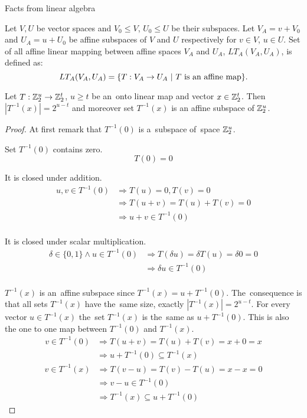 \begin{chapter}{Facts from linear algebra}
\begin{definition}
Let $V, U$ be vector spaces and $V_0 \leq V$, $U_0 \leq U$ be their subspaces. Let $V_A = v + V_0$ and $U_A = u + U_0$ be affine subspaces of $V$ and $U$ respectively for $v \in V$, $u \in U$. Set of all affine linear mapping between affine spaces $V_A$ and $U_A$, $LT_A(V_A, U_A)$, is defined as:
\[
	LT_A(V_A, U_A) = \{ T: V_A \rightarrow U_A \ | \  T \text{ is an affine map} \} \text{.}
\]
\end{definition}

\begin{lemma}
\label{lemma-linear-transformation-domain-distribution}
Let $T: \mathbb{Z}_{2}^{u} \rightarrow \mathbb{Z}_{2}^{t}$, $u \geq t$ be an~onto linear map and vector $x \in \mathbb{Z}_{2}^{t}$. Then $|T^{-1}(x)| = 2 ^ {u - t}$ and moreover set $T^{-1}(x)$ is an affine subspace of $\mathbb{Z}_{2}^{u}$.
\end{lemma}
\begin{proof}
At first remark that $T^{-1}(0)$ is a~subspace of~space $\mathbb{Z}_{2}^{u}$.

Set $T^{-1}(0)$ contains zero.
\[ T(0) = 0 \]

It is closed under addition.
\[
\begin{split}
u, v \in T^{-1}(0) 
	& \Rightarrow T(u) = 0, T(v) = 0 \\ 
	& \Rightarrow T(u + v) = T(u) + T(v) = 0 \\ 
	& \Rightarrow u + v \in T^{-1}(0) \\
\end{split}
\]

It is closed under scalar multiplication.
\[
\begin{split}
\delta \in \{0, 1\} \wedge u \in T^{-1}(0) 
	& \Rightarrow T(\delta u) = \delta T(u) = \delta 0 = 0 \\
	& \Rightarrow \delta u \in T^{-1}(0) \\
\end{split}
\]

$T^{-1}(x)$ is an~affine subspace since $T^{-1}(x) = u + T^{-1}(0)$. The~consequence is that all sets $T^{-1}(x)$ have the~same size, exactly $|T^{-1}(x)| = 2^{u-t}$. For every vector $u \in T^{-1}(x)$ the~set $T^{-1}(x)$ is the~same as $u + T^{-1}(0)$. This is also the one to one map between $T^{-1}(0)$ and $T^{-1}(x)$.
\begin{displaymath}
\begin{split}
v \in T^{-1}(0) 
	& \Rightarrow T(u+v) = T(u) + T(v) = x + 0 = x  \\
	& \Rightarrow u + T^{-1}(0) \subseteq T^{-1}(x)
\end{split}
\end{displaymath}
\begin{displaymath}
\begin{split}
v \in T^{-1}(x) 
	& \Rightarrow T(v-u) = T(v) - T(u) = x - x = 0 \\
	& \Rightarrow v - u \in T^{-1}(0) \\
	& \Rightarrow T^{-1}(x) \subseteq u + T^{-1}(0)
\end{split}
\end{displaymath}
\end{proof}


\end{chapter}
